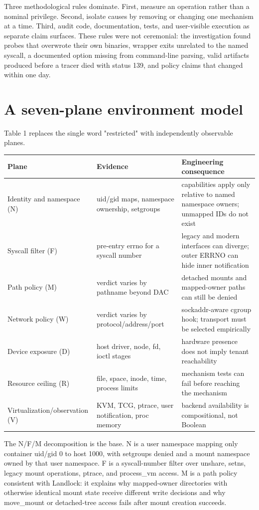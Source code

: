\documentclass[10pt,twocolumn]{article}
\begin{document}
Three methodological rules dominate. First, measure an operation rather than a nominal privilege. Second, isolate causes by removing or changing one mechanism at a time. Third, audit code, documentation, tests, and user-visible execution as separate claim surfaces. These rules were not ceremonial: the investigation found probes that overwrote their own binaries, wrapper exits unrelated to the named syscall, a documented option missing from command-line parsing, valid artifacts produced before a tracer died with status 139, and policy claims that changed within one day.

\section{A seven-plane environment model}
Table 1 replaces the single word "restricted" with independently observable planes.

\begin{table}[t]
\centering\footnotesize
\begin{tabularx}{\textwidth}{>{\raggedright\arraybackslash}X>{\raggedright\arraybackslash}X>{\raggedright\arraybackslash}X}
\toprule
\textbf{Plane} & \textbf{Evidence} & \textbf{Engineering consequence} \\
\midrule
Identity and namespace (N) & uid/gid maps, namespace ownership, setgroups & capabilities apply only relative to named namespace owners; unmapped IDs do not exist \\
Syscall filter (F) & pre-entry errno for a syscall number & legacy and modern interfaces can diverge; outer ERRNO can hide inner notification \\
Path policy (M) & verdict varies by pathname beyond DAC & detached mounts and mapped-owner paths can still be denied \\
Network policy (W) & verdict varies by protocol/address/port & sockaddr-aware cgroup hook; transport must be selected empirically \\
Device exposure (D) & host driver, node, fd, ioctl stages & hardware presence does not imply tenant reachability \\
Resource ceiling (R) & file, space, inode, time, process limits & mechanism tests can fail before reaching the mechanism \\
Virtualization/observation (V) & KVM, TCG, ptrace, user notification, proc memory & backend availability is compositional, not Boolean \\
\bottomrule
\end{tabularx}
\end{table}
The N/F/M decomposition is the base. N is a user namespace mapping only container uid/gid 0 to host 1000, with setgroups denied and a mount namespace owned by that user namespace. F is a syscall-number filter over unshare, setns, legacy mount operations, ptrace, and process\_vm access. M is a path policy consistent with Landlock: it explains why mapped-owner directories with otherwise identical mount state receive different write decisions and why move\_mount or detached-tree access fails after mount creation succeeds.
\end{document}
